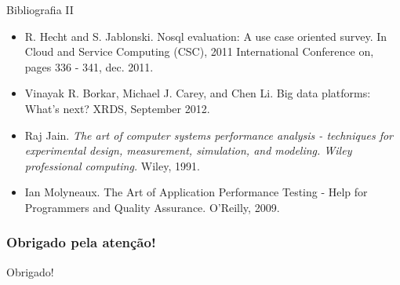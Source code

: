 \begin{frame}{Bibliografia II}
\begin{itemize}

\item R. Hecht and S. Jablonski. Nosql evaluation: A use case oriented survey. In Cloud
and Service Computing (CSC), 2011 International Conference on, pages 336 - 341,
dec. 2011.

\item Vinayak R. Borkar, Michael J. Carey, and Chen Li. Big data platforms: What's
next? XRDS, September 2012.

\item Raj Jain. \textit{The art of computer systems performance analysis - techniques for experimental
design, measurement, simulation, and modeling. Wiley professional computing.}
Wiley, 1991.

\item Ian Molyneaux. The Art of Application Performance Testing - Help for Programmers
and Quality Assurance. O'Reilly, 2009.

\end{itemize}
\end{frame}


\appendix

\begin{frame}
  \frametitle{Obrigado pela atenção!}
  \begin{center}
    {\Huge Obrigado!}
  \end{center}
\end{frame}
